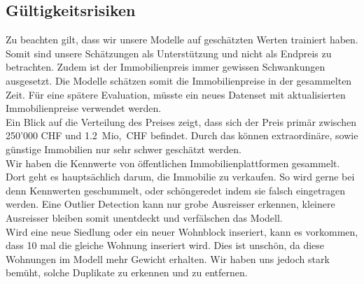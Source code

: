 \subsection{Gültigkeitsrisiken}
Zu beachten gilt, dass wir unsere Modelle auf geschätzten Werten trainiert haben. Somit sind unsere Schätzungen als Unterstützung und nicht als Endpreis zu betrachten. Zudem ist der Immobilienpreis immer gewissen Schwankungen ausgesetzt. Die Modelle schätzen somit die Immobilienpreise in der gesammelten Zeit. Für eine spätere Evaluation, müsste ein neues Datenset mit aktualisierten Immobilienpreise verwendet werden.\\
Ein Blick auf die Verteilung des Preises zeigt, dass sich der Preis primär zwischen 250'000 CHF und 1.2~Mio,~CHF befindet. Durch das können extraordinäre, sowie günstige  Immobilien nur sehr schwer geschätzt werden.\\[2ex]
%
Wir haben die Kennwerte von öffentlichen Immobilienplattformen gesammelt. Dort geht es hauptsächlich darum, die Immobilie zu verkaufen. So wird gerne bei denn Kennwerten geschummelt, oder schöngeredet indem sie falsch eingetragen werden. Eine Outlier Detection kann nur grobe Ausreisser erkennen, kleinere Ausreisser bleiben somit unentdeckt und verfälschen das Modell.\\
Wird eine neue Siedlung oder ein neuer Wohnblock inseriert, kann es vorkommen, dass 10 mal die gleiche Wohnung inseriert wird. Dies ist unschön, da diese Wohnungen im Modell mehr Gewicht erhalten. Wir haben uns jedoch stark bemüht, solche Duplikate zu erkennen und zu entfernen.

